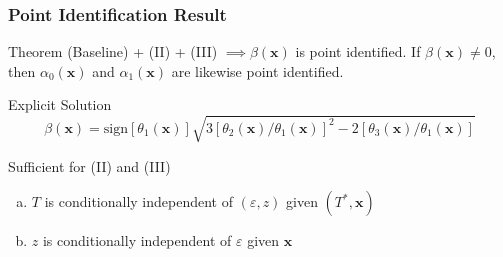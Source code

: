 \documentclass[handout]{beamer}
\begin{document}
\begin{frame}
  \frametitle{Point Identification Result}

  \small 

  \begin{alertblock}{Theorem}
    (Baseline) + (II) + (III) $\implies \beta(\mathbf{x})$ is point identified.
    If $\beta(\mathbf{x}) \neq 0$, then $\alpha_0(\mathbf{x})$ and $\alpha_1(\mathbf{x})$ are likewise point identified.
  \end{alertblock}

\vspace{1em}

  \begin{block}{Explicit Solution}
\vspace{-1em}
    \[
      \beta(\mathbf{x}) = \mbox{sign}\left[ \theta_1(\mathbf{x}) \right] \sqrt{3\left[ \theta_2(\mathbf{x})/\theta_1(\mathbf{x}) \right]^2 - 2\left[ \theta_3(\mathbf{x})/\theta_1(\mathbf{x}) \right]} 
    \]

  \end{block}

\vspace{1em}

  \begin{block}{Sufficient for (II) and (III)}
    \vspace{-0.5em}
    \begin{enumerate}[(a)]
      \item $T$ is conditionally independent of $(\varepsilon,z)$ given $(T^*,\mathbf{x})$
      \item $z$ is conditionally independent of $\varepsilon$ given $\mathbf{x}$
    \end{enumerate}
  \end{block}
\end{frame}

\end{document}
